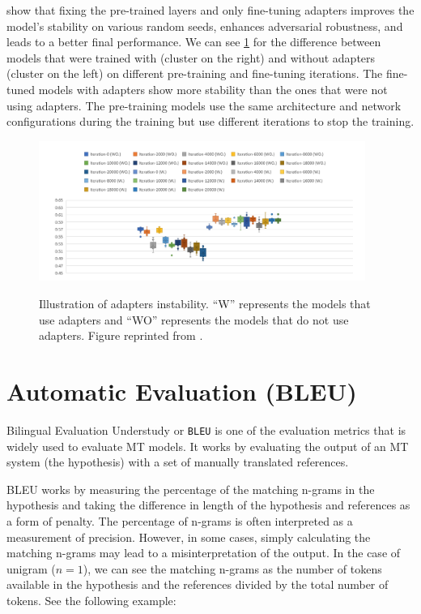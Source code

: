  show that fixing the pre-trained layers and only fine-tuning adapters improves the model's stability on various random seeds, enhances adversarial robustness, and leads to a better final performance. We can see \cref{img:adapters_instability} for the difference between models that were trained with (cluster on the right) and without adapters (cluster on the left) on different pre-training and fine-tuning iterations. The fine-tuned models with adapters show more stability than the ones that were not using adapters. The pre-training models use the same architecture and network configurations during the training but use different iterations to stop the training.

\begin{figure}[h]
    {\includegraphics[width=0.95\textwidth]{img/adapters_instability.png}}
    \centering
    \caption{Illustration of adapters instability. ``W'' represents the models that use adapters and ``WO'' represents the models that do not use adapters. Figure reprinted from \cite{han2021robust}.}
    \label{img:adapters_instability}
\end{figure}

\clearpage
\section{Automatic Evaluation (BLEU)}
\label{sec:aeval}
Bilingual Evaluation Understudy or \texttt{BLEU}  is one of the evaluation metrics that is widely used to evaluate MT models. It works by evaluating the output of an MT system (the hypothesis) with a set of manually translated references.

BLEU works by measuring the percentage of the matching n-grams in the hypothesis and taking the difference in length of the hypothesis and references as a form of penalty. The percentage of n-grams is often interpreted as a measurement of precision. However, in some cases, simply calculating the matching n-grams may lead to a misinterpretation of the output. In the case of unigram ($n=1$), we can see the matching n-grams as the number of tokens available in the hypothesis and the references divided by the total number of tokens. See the following example:

